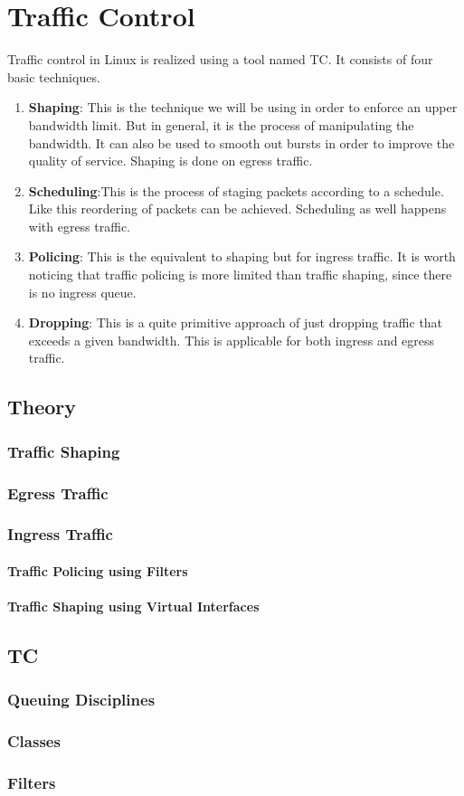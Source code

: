 \chapter{Traffic Control}
Traffic control in Linux is realized using a tool named \acs{TC}. It consists of four basic techniques.

\begin{enumerate}
\item \textbf{Shaping}: This is the technique we will be using in order to enforce an upper bandwidth limit. But in general, it is the process of manipulating the bandwidth. It can also be used to smooth out bursts in order to improve the quality of service. Shaping is done on egress traffic.

\item \textbf{Scheduling}:This is the process of staging packets according to a schedule. Like this reordering of packets can be achieved. Scheduling as well happens with egress traffic.

\item \textbf{Policing}: This is the equivalent to shaping but for ingress traffic. It is worth noticing that traffic policing is more limited than traffic shaping, since there is no ingress queue.

\item \textbf{Dropping}: This is a quite primitive approach of just dropping traffic that exceeds a given bandwidth. This is applicable for both ingress and egress traffic.

\end{enumerate}


\vfill
\section{Theory}
\subsection{Traffic Shaping}
\subsection{Egress Traffic}
\subsection{Ingress Traffic}
\subsubsection{Traffic Policing using Filters}
\subsubsection{Traffic Shaping using Virtual Interfaces}
\section{TC}
\subsection{Queuing Disciplines}
\subsection{Classes}
\subsection{Filters}